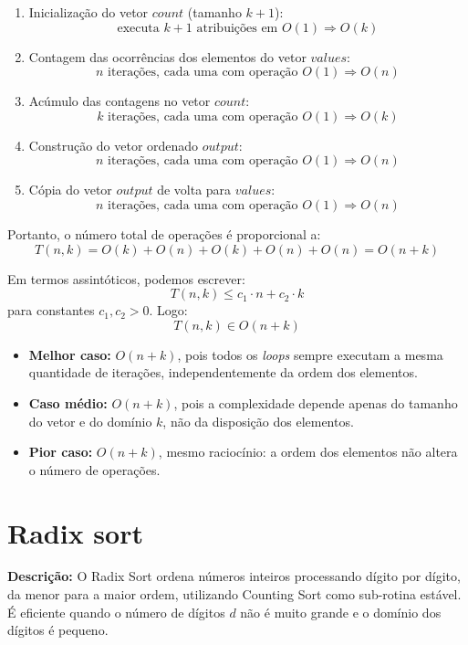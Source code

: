 \begin{enumerate}
    \item Inicialização do vetor $count$ (tamanho $k+1$):
    \[
        \text{executa } k+1 \text{ atribuições em } O(1) \Rightarrow O(k)
    \]
    
    \item Contagem das ocorrências dos elementos do vetor $values$:
    \[
        n \text{ iterações, cada uma com operação } O(1) \Rightarrow O(n)
    \]
    
    \item Acúmulo das contagens no vetor $count$:
    \[
        k \text{ iterações, cada uma com operação } O(1) \Rightarrow O(k)
    \]
    
    \item Construção do vetor ordenado $output$:
    \[
        n \text{ iterações, cada uma com operação } O(1) \Rightarrow O(n)
    \]
    
    \item Cópia do vetor $output$ de volta para $values$:
    \[
        n \text{ iterações, cada uma com operação } O(1) \Rightarrow O(n)
    \]
\end{enumerate}

Portanto, o número total de operações é proporcional a:
\[
T(n, k) = O(k) + O(n) + O(k) + O(n) + O(n) = O(n + k)
\]

\noindent Em termos assintóticos, podemos escrever:
\[
T(n, k) \leq c_1 \cdot n + c_2 \cdot k
\]
para constantes $c_1, c_2 > 0$. Logo:
\[
T(n, k) \in O(n + k)
\]

\begin{itemize}
    \item \textbf{Melhor caso:} $O(n + k)$, pois todos os \textit{loops} sempre executam a mesma quantidade de iterações, independentemente da ordem dos elementos.
    
    \item \textbf{Caso médio:} $O(n + k)$, pois a complexidade depende apenas do tamanho do vetor e do domínio $k$, não da disposição dos elementos.
    
    \item \textbf{Pior caso:} $O(n + k)$, mesmo raciocínio: a ordem dos elementos não altera o número de operações.
\end{itemize}


\section{Radix sort}
\textbf{Descrição:} O Radix Sort ordena números inteiros processando dígito por dígito, da menor para a maior ordem, utilizando Counting Sort como sub-rotina estável. É eficiente quando o número de dígitos $d$ não é muito grande e o domínio dos dígitos é pequeno.

